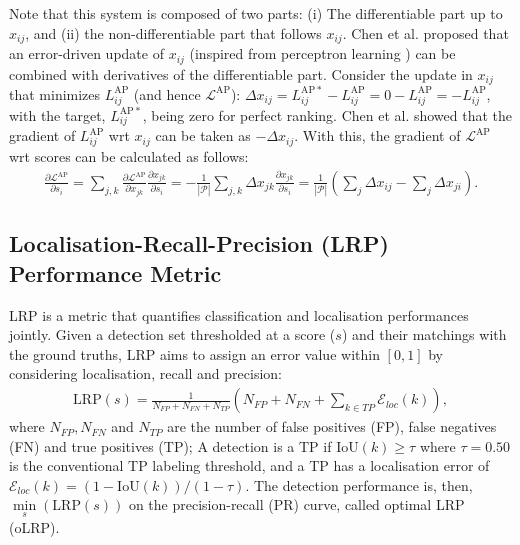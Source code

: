 \documentclass{article}
\begin{document}
Note that this system is composed of two parts: (i) The differentiable part up to $x_{ij}$, and (ii) the non-differentiable part that follows $x_{ij}$. Chen et al. proposed that an error-driven update of $x_{ij}$ (inspired from perceptron learning \cite{Rosenblatt}) can be combined with derivatives of the differentiable part. Consider the update in $x_{ij}$ that minimizes $L^{\mathrm{AP}}_{ij}$ (and hence $\mathcal{L}^{\mathrm{AP}}$): $\Delta x_{ij}={L^{{\mathrm{AP}}*}_{ij}}-L^{\mathrm{AP}}_{ij}=0-L^{\mathrm{AP}}_{ij}=-L^{\mathrm{AP}}_{ij}$, with the target, $L^{{\mathrm{AP}}*}_{ij}$, being zero for perfect ranking. Chen et al. showed that the gradient of $L^{\mathrm{AP}}_{ij}$ wrt $x_{ij}$ can be taken as $- \Delta x_{ij}$. With this, the gradient of $\mathcal{L}^{\mathrm{AP}}$ wrt scores can be calculated as follows:
\begin{align}
    \label{eq:APGradients}
    \frac{\partial \mathcal{L}^{\mathrm{AP}}}{\partial s_i} 
    = \sum \limits_{j,k} \frac{\partial \mathcal{L}^{\mathrm{AP}}}{\partial x_{jk}} \frac{\partial x_{jk}}{\partial s_i} 
    = 
    -\frac{1}{|\mathcal{P}|} \sum \limits_{j,k} \Delta x_{jk} \frac{\partial x_{jk}}{\partial s_i} 
    = \frac{1}{|\mathcal{P}|} \left( \sum \limits_{j} \Delta x_{ij} - \sum \limits_{j} \Delta x_{ji} \right). 
\end{align}











\subsection{Localisation-Recall-Precision (LRP) Performance Metric}
\label{subsec:LRP}
LRP \cite{LRP,LRParXiv} is a metric that  quantifies  classification and localisation performances jointly. Given a detection set thresholded at a score ($s$) and their matchings with the ground truths,  LRP  aims to assign an error value within $[0,1]$ by considering localisation, recall and precision:
\begin{align}
\label{eq:LRPdefcompact}
\mathrm{LRP}(s) = \frac{1}{N_{FP} +N_{FN}+{N_{TP}}}\left( N_{FP} +N_{FN} + \sum \limits_{k \in {TP}} \mathcal{E}_{loc}(k) \right),
\end{align}
where $N_{FP}, N_{FN}$ and $N_{TP}$ are the number of false positives (FP), false negatives (FN) and true positives (TP);  A detection is a TP if $\mathrm{IoU}(k) \geq \tau$ where $\tau=0.50$ is the conventional TP labeling threshold, and a TP has a localisation error of $\mathcal{E}_{loc}(k) = (1-\mathrm{IoU}(k))/(1-\tau)$. The detection performance is, then,  $\min \limits_s (\mathrm{LRP}(s))$ on the precision-recall (PR) curve, called optimal LRP (oLRP).
\end{document}
